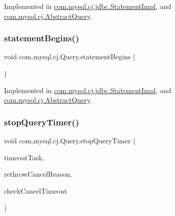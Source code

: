 Implemented in \mbox{\hyperlink{classcom_1_1mysql_1_1cj_1_1jdbc_1_1_statement_impl_a0f8e090e92e82672734e247c080f7da7}{com.\+mysql.\+cj.\+jdbc.\+Statement\+Impl}}, and \mbox{\hyperlink{classcom_1_1mysql_1_1cj_1_1_abstract_query_af15cecea61e92e9c1e6e6d01990cf568}{com.\+mysql.\+cj.\+Abstract\+Query}}.

\mbox{\label{interfacecom_1_1mysql_1_1cj_1_1_query_a103f171654654e894600c59f324b651b}} 
\subsubsection{\texorpdfstring{statement\+Begins()}{statementBegins()}}
{\footnotesize\ttfamily void com.\+mysql.\+cj.\+Query.\+statement\+Begins (\begin{DoxyParamCaption}{ }\end{DoxyParamCaption})}



Implemented in \mbox{\hyperlink{classcom_1_1mysql_1_1cj_1_1jdbc_1_1_statement_impl_a51c8920bf35fc909ec12c2755ee2c491}{com.\+mysql.\+cj.\+jdbc.\+Statement\+Impl}}, and \mbox{\hyperlink{classcom_1_1mysql_1_1cj_1_1_abstract_query_ad497079522b832383db2916bcef4a74c}{com.\+mysql.\+cj.\+Abstract\+Query}}.

\mbox{\label{interfacecom_1_1mysql_1_1cj_1_1_query_a2bee69e6ff58bb35af496297e1803c41}} 
\subsubsection{\texorpdfstring{stop\+Query\+Timer()}{stopQueryTimer()}}
{\footnotesize\ttfamily void com.\+mysql.\+cj.\+Query.\+stop\+Query\+Timer (\begin{DoxyParamCaption}\item[{\mbox{\hyperlink{interfacecom_1_1mysql_1_1cj_1_1_cancel_query_task}{Cancel\+Query\+Task}}}]{timeout\+Task,  }\item[{boolean}]{rethrow\+Cancel\+Reason,  }\item[{boolean}]{check\+Cancel\+Timeout }\end{DoxyParamCaption})}



